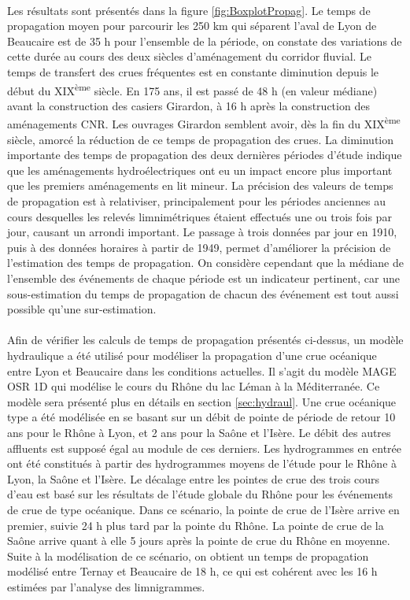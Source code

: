 \documentclass[11pt]{article}
\begin{document}
	\paragraph{} Les résultats sont présentés dans la figure \ref{fig:BoxplotPropag}. Le temps de propagation moyen pour parcourir les 250 km qui séparent l'aval de Lyon de Beaucaire est de 35 h pour l'ensemble de la période, on constate des variations de cette durée au cours des deux siècles d'aménagement du corridor fluvial. Le temps de transfert des crues fréquentes est en constante diminution depuis le début du XIX\textsuperscript{ème} siècle. En 175 ans, il est passé de 48 h (en valeur médiane) avant la construction des casiers Girardon, à 16 h après la construction des aménagements CNR. Les ouvrages Girardon semblent avoir, dès la fin du XIX\textsuperscript{ème} siècle, amorcé la réduction de ce temps de propagation des crues. La diminution importante des temps de propagation des deux dernières périodes d'étude indique que les aménagements hydroélectriques ont eu un impact encore plus important que les premiers aménagements en lit mineur. La précision des valeurs de temps de propagation est à relativiser, principalement pour les périodes anciennes au cours desquelles les relevés limnimétriques étaient effectués une ou trois fois par jour, causant un arrondi important. Le passage à trois données par jour en 1910, puis à des données horaires à partir de 1949, permet d'améliorer la précision de l'estimation des temps de propagation. On considère cependant que la médiane de l'ensemble des événements de chaque période est un indicateur pertinent, car une sous-estimation du temps de propagation de chacun des événement est tout aussi possible qu'une sur-estimation. 
	
	\paragraph{} Afin de vérifier les calculs de temps de propagation présentés ci-dessus, un modèle hydraulique a été utilisé pour modéliser la propagation d'une crue océanique entre Lyon et Beaucaire dans les conditions actuelles. Il s'agit du modèle MAGE OSR 1D qui modélise le cours du Rhône du lac Léman à la Méditerranée. Ce modèle sera présenté plus en détails en section \ref{sec:hydraul}. Une crue océanique type a été modélisée en se basant sur un débit de pointe de période de retour 10 ans pour le Rhône à Lyon, et 2 ans pour la Saône et l'Isère. Le débit des autres affluents est supposé égal au module de ces derniers. Les hydrogrammes en entrée ont été constitués à partir des hydrogrammes moyens de l'étude \citet{bard_actualisation_2018} pour le Rhône à Lyon, la Saône et l'Isère. Le décalage entre les pointes de crue des trois cours d'eau est basé sur les résultats de l'étude globale du Rhône \citep{rigaudiere_etude_2000} pour les événements de crue de type océanique. Dans ce scénario, la pointe de crue de l'Isère arrive en premier, suivie 24 h plus tard par la pointe du Rhône. La pointe de crue de la Saône arrive quant à elle 5 jours après la pointe de crue du Rhône en moyenne. Suite à la modélisation de ce scénario, on obtient un temps de propagation modélisé entre Ternay et Beaucaire de 18 h, ce qui est cohérent avec les 16 h estimées par l'analyse des limnigrammes. 
\end{document}
